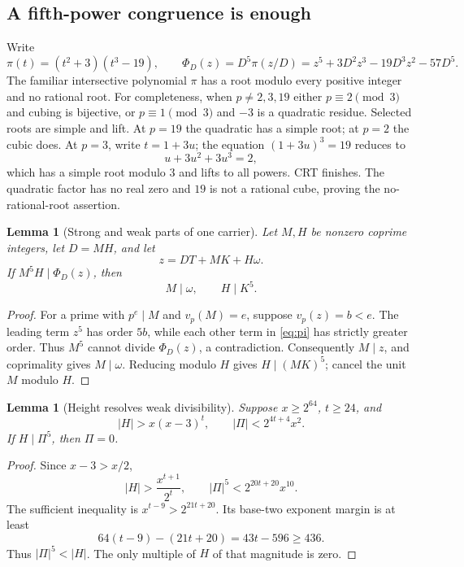 \documentclass[11pt]{article}
\newtheorem{lemma}[theorem]{Lemma}
\theoremstyle{definition}
\theoremstyle{remark}
\begin{document}
\subsection{A fifth-power congruence is enough}
Write
\begin{equation}\label{eq:pi}
 \pi(t)=(t^2+3)(t^3-19),\qquad
 \Phi_D(z)=D^5\pi(z/D)
 =z^5+3D^2z^3-19D^3z^2-57D^5.
\end{equation}
The familiar intersective polynomial $\pi$ has a root modulo every
positive integer and no rational root\cite{hyde2014}. For completeness,
when $p\ne2,3,19$ either $p\equiv2\pmod3$ and cubing is bijective,
or $p\equiv1\pmod3$ and $-3$ is a quadratic residue. Selected roots
are simple and lift. At $p=19$ the quadratic has a simple root; at
$p=2$ the cubic does. At $p=3$, write $t=1+3u$; the equation
$(1+3u)^3=19$ reduces to
\[
 u+3u^2+3u^3=2,
\]
which has a simple root modulo $3$ and lifts to all powers. CRT
finishes. The quadratic factor has no real zero and $19$ is not a
rational cube, proving the no-rational-root assertion.

\begin{lemma}[Strong and weak parts of one carrier]\label{lem:carrier}
Let $M,H$ be nonzero coprime integers, let $D=MH$, and let
\[
 z=DT+MK+H\omega.
\]
If $M^5H\mid\Phi_D(z)$, then
\[
 M\mid\omega,\qquad H\mid K^5.
\]
\end{lemma}
\begin{proof}
For a prime with $p^e\mid M$ and $v_p(M)=e$, suppose $v_p(z)=b<e$.
The leading term $z^5$ has order $5b$, while each other term in
\eqref{eq:pi} has strictly greater order. Thus $M^5$ cannot divide
$\Phi_D(z)$, a contradiction. Consequently $M\mid z$, and
coprimality gives $M\mid\omega$. Reducing modulo $H$ gives
$H\mid(MK)^5$; cancel the unit $M$ modulo $H$.
\end{proof}

\begin{lemma}[Height resolves weak divisibility]\label{lem:power5}
Suppose $x\ge2^{64}$, $t\ge24$, and
\[
 |H|>x(x-3)^t,\qquad
 |\Pi|<2^{4t+4}x^2.
\]
If $H\mid\Pi^5$, then $\Pi=0$.
\end{lemma}
\begin{proof}
Since $x-3>x/2$,
\[
 |H|>\frac{x^{t+1}}{2^t},\qquad
 |\Pi|^5<2^{20t+20}x^{10}.
\]
The sufficient inequality is
$x^{t-9}>2^{21t+20}$. Its base-two exponent margin is at least
\[
 64(t-9)-(21t+20)=43t-596\ge436.
\]
Thus $|\Pi|^5<|H|$. The only multiple of $H$ of that magnitude is zero.
\end{proof}
\end{document}

